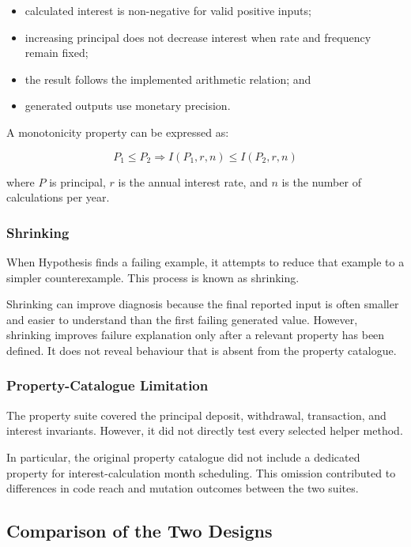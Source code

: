 \documentclass[12pt]{article}
\begin{document}
\begin{itemize}
    \item calculated interest is non-negative for valid positive inputs;
    \item increasing principal does not decrease interest when rate and
          frequency remain fixed;
    \item the result follows the implemented arithmetic relation; and
    \item generated outputs use monetary precision.
\end{itemize}

A monotonicity property can be expressed as:

\[
P_1 \leq P_2
\Longrightarrow
I(P_1,r,n) \leq I(P_2,r,n)
\]

where \(P\) is principal, \(r\) is the annual interest rate, and \(n\) is the
number of calculations per year.

\subsubsection{Shrinking}

When Hypothesis finds a failing example, it attempts to reduce that example to
a simpler counterexample. This process is known as shrinking.

Shrinking can improve diagnosis because the final reported input is often
smaller and easier to understand than the first failing generated value.
However, shrinking improves failure explanation only after a relevant property
has been defined. It does not reveal behaviour that is absent from the
property catalogue.

\subsubsection{Property-Catalogue Limitation}

The property suite covered the principal deposit, withdrawal, transaction, and
interest invariants. However, it did not directly test every selected helper
method.

In particular, the original property catalogue did not include a dedicated
property for interest-calculation month scheduling. This omission contributed
to differences in code reach and mutation outcomes between the two suites.

\subsection{Comparison of the Two Designs}
\end{document}
